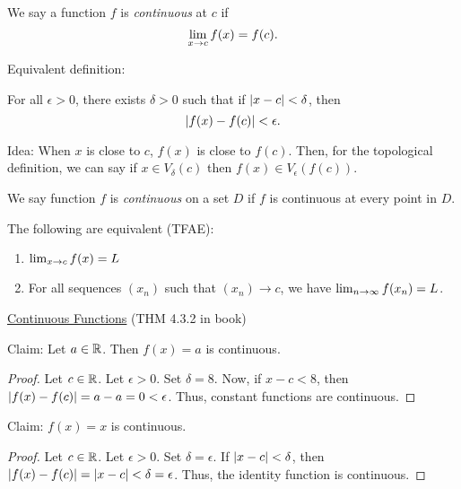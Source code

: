 \begin{definition}
    We say a function \(f\) is \textit{continuous} at \(c\) if
    \[
        \lim_{x \rightarrow c}f(x) = f(c).
    \]

    Equivalent definition:

    For all \(\epsilon > 0\), there exists \(\delta > 0\) such that if \(\left|x - c\right| < \delta\), then
    \[
        \left|f(x) - f(c)\right| < \epsilon.
    \]
\end{definition}

Idea: When \(x\) is close to \(c\), \(f(x)\) is close to \(f(c)\). Then, for the topological definition, we can say if \(x \in V_\delta(c)\) then \(f(x) \in V_\epsilon(f(c))\).

\begin{definition}
    We say function \(f\) is \textit{continuous} on a set \(D\) if \(f\) is continuous at every point in \(D\).
\end{definition}

The following are equivalent (TFAE):

\begin{enumerate}
    \item \(\lim_{x \rightarrow c}f(x) = L\)
    \item For all sequences \((x_n)\) such that \((x_n) \rightarrow c\), we have \(\lim_{n \rightarrow \infty} f(x_n) = L\).
\end{enumerate}

\begin{center}
    \underline{Continuous Functions} (THM 4.3.2 in book)
\end{center}

Claim: Let \(a \in \mathbb{R}\). Then \(f(x) = a\) is continuous.

\begin{customframedproof}[linecolor=xgray]
    \begin{proof}
        Let \(c \in \mathbb{R}\). Let \(\epsilon > 0\). Set \(\delta = 8\). Now, if \(x - c < 8\), then \(\left|f(x) - f(c)\right| = a - a = 0 < \epsilon\). Thus, constant functions are continuous.
    \end{proof}
\end{customframedproof}

Claim: \(f(x) = x\) is continuous.

\begin{customframedproof}[linecolor=xgray]
    \begin{proof}
        Let \(c \in \mathbb{R}\). Let \(\epsilon > 0\). Set \(\delta = \epsilon\). If \(\left|x - c\right| < \delta\), then \(\left|f(x) - f(c)\right| = \left|x - c\right| < \delta = \epsilon\). Thus, the identity function is continuous.
    \end{proof}
\end{customframedproof}

